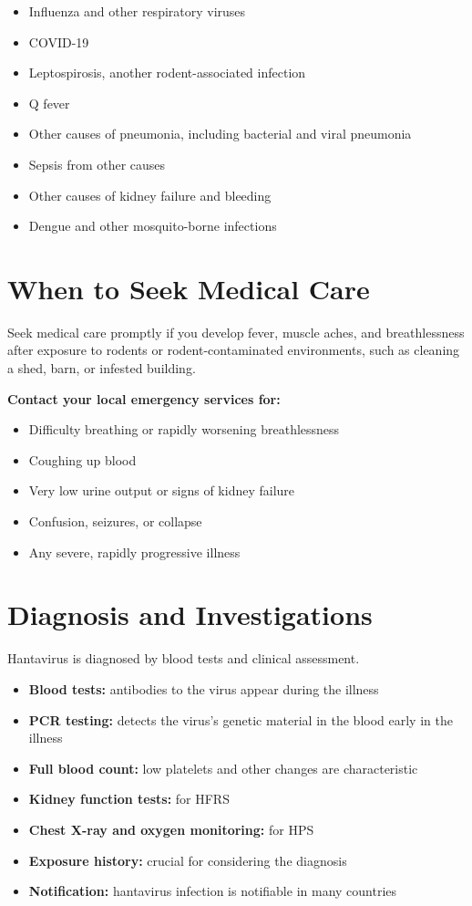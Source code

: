 \begin{itemize}
    \item Influenza and other respiratory viruses
    \item COVID-19
    \item Leptospirosis, another rodent-associated infection
    \item Q fever
    \item Other causes of pneumonia, including bacterial and viral pneumonia
    \item Sepsis from other causes
    \item Other causes of kidney failure and bleeding
    \item Dengue and other mosquito-borne infections
\end{itemize}

\section*{When to Seek Medical Care}
Seek medical care promptly if you develop fever, muscle aches, and breathlessness after exposure to rodents or rodent-contaminated environments, such as cleaning a shed, barn, or infested building.

\textbf{Contact your local emergency services for:}
\begin{itemize}
    \item Difficulty breathing or rapidly worsening breathlessness
    \item Coughing up blood
    \item Very low urine output or signs of kidney failure
    \item Confusion, seizures, or collapse
    \item Any severe, rapidly progressive illness
\end{itemize}

\section*{Diagnosis and Investigations}
Hantavirus is diagnosed by blood tests and clinical assessment.

\begin{itemize}
    \item \textbf{Blood tests:} antibodies to the virus appear during the illness
    \item \textbf{PCR testing:} detects the virus's genetic material in the blood early in the illness
    \item \textbf{Full blood count:} low platelets and other changes are characteristic
    \item \textbf{Kidney function tests:} for HFRS
    \item \textbf{Chest X-ray and oxygen monitoring:} for HPS
    \item \textbf{Exposure history:} crucial for considering the diagnosis
    \item \textbf{Notification:} hantavirus infection is notifiable in many countries
\end{itemize}

